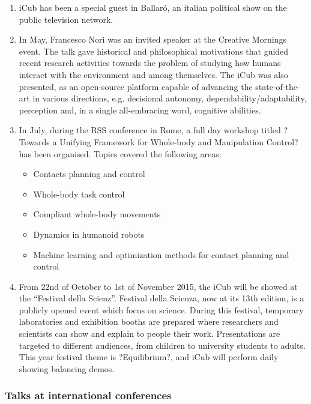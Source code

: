 \begin{enumerate}
\item iCub has been a special guest in Ballar\'o, an italian political show on the public television network.

\item In May, Francesco Nori was an invited speaker at the Creative Mornings event. The talk gave historical and philosophical motivations that guided recent research activities towards the problem of studying how humans interact with the environment and among themselves. The iCub was also presented, as an open-source platform capable of advancing the state-of-the-art in various directions, e.g. decisional autonomy, dependability/adaptability, perception and, in a single all-embracing word, cognitive abilities.

\item In July, during the RSS conference in Rome, a full day workshop titled ?Towards a Unifying Framework for Whole-body and Manipulation Control? has been organised. Topics covered the following areas:
\begin{itemize}
\item Contacts planning and control
\item Whole-body task control
\item Compliant whole-body movements
\item Dynamics in humanoid robots
\item Machine learning and optimization methods for contact planning and control
\end{itemize}

\item From 22nd of October to 1st of November 2015, the iCub will be showed at the ``Festival della Scienz''. Festival della Scienza, now at its 13th edition, is a publicly opened event which focus on science. During this festival, temporary laboratories and exhibition booths are prepared where researchers and scientists can show and explain to people their work. Presentations are targeted to different audiences, from children to university students to adults. This year festival theme is ?Equilibrium?, and iCub will perform daily showing balancing demos. 

\end{enumerate}

\subsubsection{Talks at international conferences}

